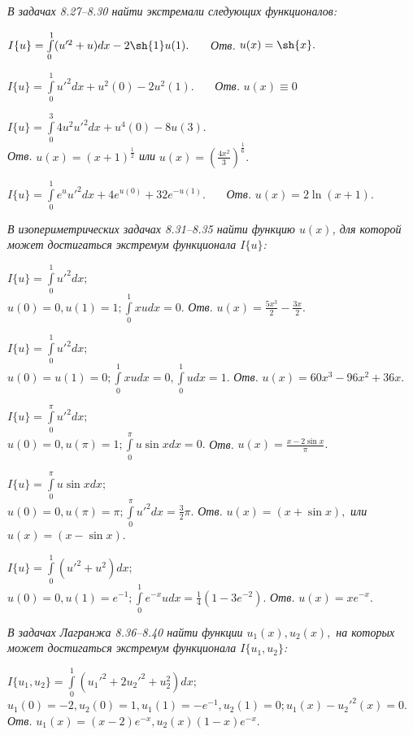 	\vspace{1cm}
	{\it В задачах 8.27–8.30 найти экстремали следующих функционалов:}

	\newpage %

	\zadanie
	$I\{u\}= \int\limits_0^1 (u'^2 + u)dx - 2\sh{1}u(1).$ \, \, \, {\it Отв.} $u(x)=\sh{x}.$

	\zadanie
	$I\{u\}=\int\limits_0^1 u'^2dx +u^2(0)-2u^2(1).$ \, \, \, {\it Отв.} $u(x)\equiv 0$

	\zadanie
	$I\{u\}= \int\limits_0^3 4u^2u'^2dx +u^4(0)-8u(3).$ \\
	{\it Отв.} $u(x)=(x+1)^{\frac{1}{2}}$ {\it или} $u(x)=(\frac{4x^2}{3})^\frac{1}{6}.$

	\zadanie
	$I\{u\}=\int\limits_0^1 e^uu'^2dx + 4e^{u(0)}+32e^{-u(1)}.$ \, \, \, {\it Отв.} $u(x)=2\ln{(x+1)}.$

	\vspace{3mm}
	{\it В изопериметрических задачах 8.31–8.35 найти функцию $u(x)$, для которой может достигаться экстремум функционала $I\{u\}$:}
	\vspace{3mm}

	\zadanie
	$I\{u\}=\int\limits_0^1 u'^2dx;$\\
	$u(0)=0, u(1)=1; \int\limits_0^1 xudx = 0.$ {\it Отв.} $u(x)=\frac{5x^3}{2}-\frac{3x}{2}.$

	\zadanie
		$I\{u\}= \int\limits_0^1 u'^2dx;$\\
		$u(0)=u(1)=0; \int\limits_0^1 xudx = 0, \int\limits_0^1 udx = 1.$ {\it Отв.} $u(x)=60x^3-96x^2+36x.$

	\zadanie
	$I\{u\}=\int\limits_0^\pi u'^2dx;$\\
	$u(0)=0, u(\pi)=1; \int\limits_0^\pi u\sin{x}dx=0.$ {\it Отв.} $u(x)=\frac{x-2\sin{x}}{\pi}.$

	\zadanie
	$I\{u\}=\int\limits_0^\pi u\sin{x}dx;$\\
	$u(0)=0, u(\pi)=\pi; \int\limits_0^\pi u'^2dx = \frac{3}{2}\pi.$ {\it Отв.} $u(x)=(x+\sin{x}),$ {\it или} $u(x)=(x-\sin{x}).$

	\zadanie
		$I\{u\}=\int\limits_0^1 (u'^2+u^2)dx;$\\
		$u(0)=0, u(1)=e^{-1}; \int\limits_0^1 e^{-x}udx = \frac{1}{4}(1-3e^{-2}).$ {\it Отв.} $u(x)=xe^{-x}.$

	\vspace{1cm}
	{\it В задачах Лагранжа 8.36–8.40 найти функции $u_1(x),u_2(x),$ на которых может достигаться экстремум функционала $I\{u_1,u_2\}$:}

	\newpage
	\zadanie
	$I\{u_1,u_2\}=\int\limits_0^1 (u_1'^2 +2u_2'^2+u_2^2)dx;$\\
	$u_1(0)=-2, u_2(0)=1, u_1(1)=-e^{-1}, u_2(1)=0; u_1(x)-u_2'^2(x)=0.$\\
	{\it Отв.} $u_1(x)=(x-2)e^{-x}, u_2(x)(1-x)e^{-x}.$

